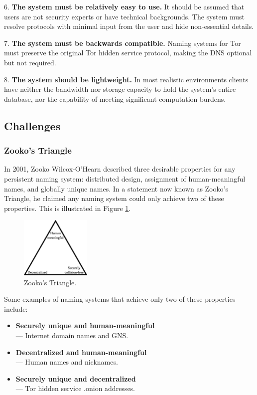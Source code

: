 \documentclass[conference]{IEEEtran}
\begin{document}
6. \textbf{The system must be relatively easy to use.} It should be assumed that users are not security experts or have technical backgrounds. The system must resolve protocols with minimal input from the user and hide non-essential details.

7. \textbf{The system must be backwards compatible.} Naming systems for Tor must preserve the original Tor hidden service protocol, making the DNS optional but not required.

8. \textbf{The system should be lightweight.} In most realistic environments clients have neither the bandwidth nor storage capacity to hold the system's entire database, nor the capability of meeting significant computation burdens.

\subsection{Challenges}

\subsubsection{Zooko's Triangle}
\label{sec:ZookosTriangle}

In 2001, Zooko Wilcox-O'Hearn described three desirable properties for any persistent naming system: distributed design, assignment of human-meaningful names, and globally unique names. In a statement now known as Zooko's Triangle,\cite{ferdous2009security}\cite{stiegler2005petname} he claimed any naming system could only achieve two of these properties. This is illustrated in Figure \ref{fig:ZookosTriangle}.

\begin{figure}[htbp]
	\centering
	\includegraphics[width=0.3\textwidth]{../assets/images/Zooko.eps}
	\caption{Zooko's Triangle.}
	\label{fig:ZookosTriangle}
\end{figure}

\newpage

Some examples of naming systems that achieve only two of these properties include:

\begin{itemize}
	\item \textbf{Securely unique and human-meaningful} \\ --- Internet domain names and GNS.
	\item \textbf{Decentralized and human-meaningful} \\ --- Human names and nicknames.
	\item \textbf{Securely unique and decentralized} \\ --- Tor hidden service .onion addresses.
\end{itemize}
\end{document}
